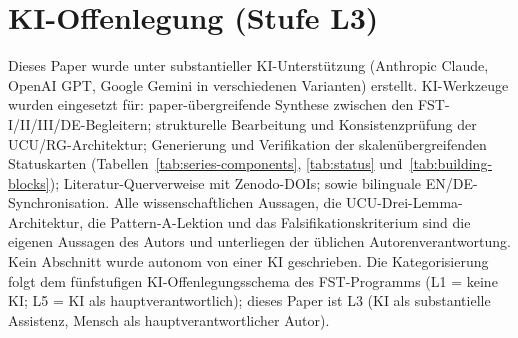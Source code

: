 \documentclass[11pt,a4paper]{article}
\theoremstyle{remark}
\begin{document}
\section*{KI-Offenlegung (Stufe L3)}
Dieses Paper wurde unter substantieller KI-Unterstützung (Anthropic Claude, OpenAI GPT, Google Gemini in verschiedenen Varianten) erstellt. KI-Werkzeuge wurden eingesetzt für: paper-übergreifende Synthese zwischen den FST-I/II/III/DE-Begleitern; strukturelle Bearbeitung und Konsistenzprüfung der UCU/RG-Architektur; Generierung und Verifikation der skalenübergreifenden Statuskarten (Tabellen~\ref{tab:series-components}, \ref{tab:status} und~\ref{tab:building-blocks}); Literatur-Querverweise mit Zenodo-DOIs; sowie bilinguale EN/DE-Synchronisation. Alle wissenschaftlichen Aussagen, die UCU-Drei-Lemma-Architektur, die Pattern-A-Lektion und das Falsifikationskriterium sind die eigenen Aussagen des Autors und unterliegen der üblichen Autorenverantwortung. Kein Abschnitt wurde autonom von einer KI geschrieben. Die Kategorisierung folgt dem fünfstufigen KI-Offenlegungsschema des FST-Programms (L1 = keine KI; L5 = KI als hauptverantwortlich); dieses Paper ist L3 (KI als substantielle Assistenz, Mensch als hauptverantwortlicher Autor).
\end{document}
